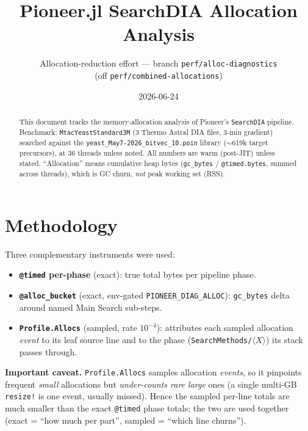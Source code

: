 \documentclass[11pt]{article}
\title{Pioneer.jl SearchDIA Allocation Analysis}
\author{Allocation-reduction effort --- branch \texttt{perf/alloc-diagnostics}\\(off \texttt{perf/combined-allocations})}
\date{2026-06-24}
\begin{document}
\maketitle

\begin{abstract}
This document tracks the memory-allocation analysis of Pioneer's \texttt{SearchDIA}
pipeline. Benchmark: \texttt{MtacYeastStandard3M} (3 Thermo Astral DIA files, 3-min
gradient) searched against the \texttt{yeast\_May7-2026\_bitvec\_10.poin} library
($\sim$619k target precursors), at 36 threads unless noted. All numbers are warm
(post-JIT) unless stated. ``Allocation'' means cumulative heap bytes
(\texttt{gc\_bytes} / \texttt{@timed.bytes}, summed across threads), which is GC
churn, \emph{not} peak working set (RSS).
\end{abstract}

\section{Methodology}
Three complementary instruments were used:
\begin{itemize}
  \item \textbf{\texttt{@timed} per-phase} (exact): true total bytes per pipeline phase.
  \item \textbf{\texttt{@alloc\_bucket}} (exact, env-gated \texttt{PIONEER\_DIAG\_ALLOC}):
        \texttt{gc\_bytes} delta around named Main Search sub-steps.
  \item \textbf{\texttt{Profile.Allocs}} (sampled, rate $10^{-4}$): attributes each
        sampled allocation \emph{event} to its leaf source line and to the phase
        (\texttt{SearchMethods/}$\langle X\rangle$) its stack passes through.
\end{itemize}
\textbf{Important caveat.} \texttt{Profile.Allocs} samples allocation \emph{events},
so it pinpoints frequent \emph{small} allocations but \emph{under-counts rare large}
ones (a single multi-GB \texttt{resize!} is one event, usually missed). Hence the
sampled per-line totals are much smaller than the exact \texttt{@timed} phase totals;
the two are used together (exact = ``how much per part'', sampled = ``which line churns'').
\end{document}
